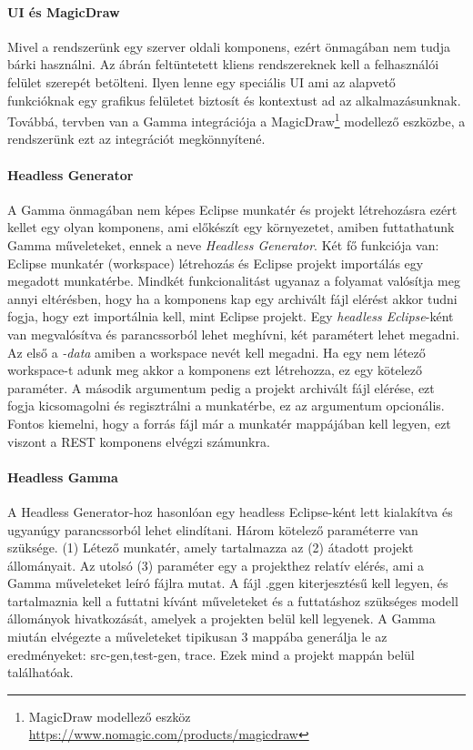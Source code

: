 \paragraph{UI és MagicDraw} Mivel a rendszerünk egy szerver oldali komponens, ezért önmagában nem tudja bárki használni. Az ábrán feltüntetett kliens rendszereknek kell a felhasználói felület szerepét betölteni. Ilyen lenne egy speciális UI ami az alapvető funkcióknak egy grafikus felületet biztosít és kontextust ad az alkalmazásunknak. Továbbá, tervben van a Gamma integrációja a MagicDraw\footnote{MagicDraw modellező eszköz \url{https://www.nomagic.com/products/magicdraw}} modellező eszközbe, a rendszerünk ezt az integrációt megkönnyítené. 

\paragraph{Headless Generator} A Gamma önmagában nem képes Eclipse munkatér és projekt létrehozásra ezért kellet egy olyan komponens, ami előkészít egy környezetet, amiben futtathatunk Gamma műveleteket, ennek a neve \textit{Headless Generator}. Két fő funkciója van: Eclipse munkatér (workspace) létrehozás és Eclipse projekt importálás egy megadott munkatérbe. Mindkét funkcionalitást ugyanaz a folyamat valósítja meg annyi eltérésben, hogy ha a komponens kap egy archivált fájl elérést akkor tudni fogja, hogy ezt importálnia kell, mint Eclipse projekt.  Egy \textit{headless Eclipse}-ként van megvalósítva és parancssorból lehet meghívni, két paramétert lehet megadni. Az első a \textit{-data} amiben a workspace nevét kell megadni. Ha egy nem létező workspace-t adunk meg akkor a komponens ezt létrehozza, ez egy kötelező paraméter. A második argumentum pedig a projekt archivált fájl elérése, ezt fogja kicsomagolni és regisztrálni a munkatérbe, ez az argumentum opcionális. Fontos kiemelni, hogy a forrás fájl már a munkatér mappájában kell legyen, ezt viszont a REST komponens elvégzi számunkra.

\paragraph{Headless Gamma} A Headless Generator-hoz hasonlóan egy headless Eclipse-ként lett kialakítva és ugyanúgy parancssorból lehet elindítani. Három kötelező paraméterre van szüksége. (1) Létező munkatér, amely tartalmazza az (2) átadott projekt állományait. Az utolsó (3) paraméter egy a projekthez relatív elérés, ami a Gamma műveleteket leíró fájlra mutat. A fájl .ggen kiterjesztésű kell legyen, és tartalmaznia kell a futtatni kívánt műveleteket és a futtatáshoz szükséges modell állományok hivatkozását, amelyek a projekten belül kell legyenek. A Gamma miután elvégezte a műveleteket tipikusan 3 mappába generálja le az eredményeket: src-gen,test-gen, trace. Ezek mind a projekt mappán belül találhatóak. 


